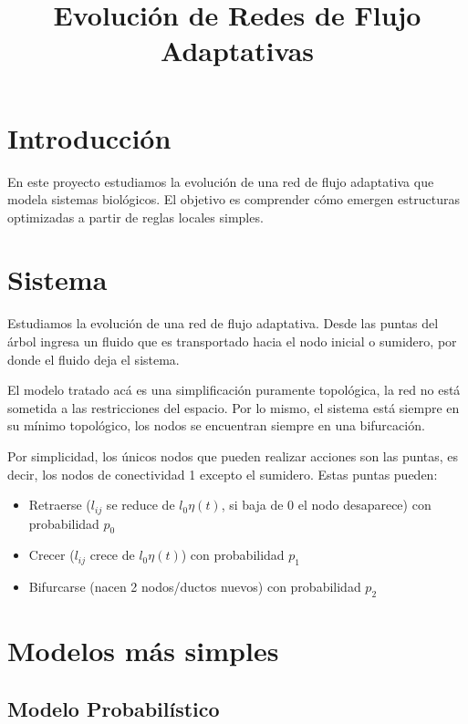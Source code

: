 \documentclass{article}
\title{Evolución de Redes de Flujo Adaptativas}
\author{}
\date{}
\begin{document}
\maketitle

\section{Introducción}

En este proyecto estudiamos la evolución de una red de flujo adaptativa que modela sistemas biológicos. El objetivo es comprender cómo emergen estructuras optimizadas a partir de reglas locales simples.

\section{Sistema}

Estudiamos la evolución de una red de flujo adaptativa. Desde las puntas del árbol ingresa un fluido que es transportado hacia el nodo inicial o sumidero, por donde el fluido deja el sistema.

El modelo tratado acá es una simplificación puramente topológica, la red no está sometida a las restricciones del espacio. Por lo mismo, el sistema está siempre en su mínimo topológico, los nodos se encuentran siempre en una bifurcación.

Por simplicidad, los únicos nodos que pueden realizar acciones son las puntas, es decir, los nodos de conectividad 1 excepto el sumidero. Estas puntas pueden:

\begin{itemize}
    \item Retraerse ($l_{ij}$ se reduce de $l_0 \eta (t)$, si baja de 0 el nodo desaparece) con probabilidad $p_0$
    \item Crecer ($l_{ij}$ crece de $l_0\eta (t)$) con probabilidad $p_1$
    \item Bifurcarse (nacen 2 nodos/ductos nuevos) con probabilidad $p_2$
\end{itemize} 

\section{Modelos más simples}

\subsection{Modelo Probabilístico}
\end{document}
